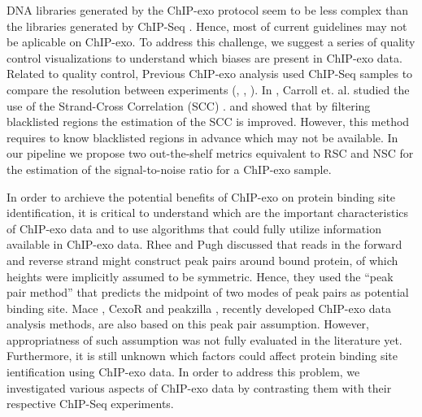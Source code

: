 \documentclass{bmcart}\usepackage[]{graphicx}\usepackage[]{color}
\begin{document}
DNA libraries generated by the ChIP-exo protocol seem to be less
complex than the libraries generated by ChIP-Seq
\cite{exo_review}. Hence, most of current guidelines \cite{encode_qc}
may not be aplicable on ChIP-exo. To address this challenge, we
suggest a series of quality control visualizations to understand which
biases are present in ChIP-exo data. Related to quality control,
Previous ChIP-exo analysis used ChIP-Seq samples to compare the
resolution between experiments (\cite{exo1}, \cite{exo2},
\cite{exoillumina}). In \cite{carroll.qc}, Carroll et. al. studied the
use of the Strand-Cross Correlation (SCC) \cite{strandcc}. and showed
that by filtering blacklisted regions the estimation of the SCC is
improved. However, this method requires to know blacklisted regions in
advance which may not be available. In our pipeline we propose two
out-the-shelf metrics equivalent to RSC and NSC for the estimation of
the signal-to-noise ratio for a ChIP-exo sample.

In order to archieve the potential benefits of ChIP-exo on protein
binding site identification, it is critical to understand which are
the important characteristics of ChIP-exo data and to use algorithms
that could fully utilize information available in ChIP-exo data. Rhee
and Pugh \cite{exo1} discussed that reads in the forward and reverse
strand might construct peak pairs around bound protein, of which
heights were implicitly assumed to be symmetric. Hence, they used the
``peak pair method'' that predicts the midpoint of two modes of peak
pairs as potential binding site. Mace \cite{mace}, CexoR \cite{cexor}
and peakzilla \cite{peakzilla}, recently developed ChIP-exo data
analysis methods, are also based on this peak pair
assumption. However, appropriatness of such assumption was not fully
evaluated in the literature yet.  Furthermore, it is still unknown
which factors could affect protein binding site ientification using
ChIP-exo data. In order to address this problem, we investigated
various aspects of ChIP-exo data by contrasting them with their
respective ChIP-Seq experiments.
\end{document}
